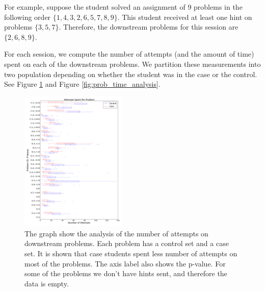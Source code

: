 \documentclass{sigchi}
\begin{document}
For example, suppose the student solved an assignment of 9 problems in the
following order $\{ 1, 4, 3, 2, 6, 5, 7, 8, 9\}$. This student
received at least one hint on problems $\{3, 5, 7\}$. Therefore, the
downstream problems for this session are $\{2, 6, 8, 9\}$.

For each session, we compute the number of attempts (and the amount of
time) spent on each of the downstream problems. We partition these
measurements into two population depending on whether the student was
in the case or the control. See Figure \ref{fig:prob_tries_analysis} and Figure \ref{fig:prob_time_analysis}.

\begin{figure}[ht]
  \centering
  \includegraphics[width=0.45\textwidth]{image/problem_tries_downstream.png}
  \caption{The graph show the analysis of the number of attempts on downstream problems. Each problem has a control set and a case set. It is shown that case students spent less number of attempts on most of the problems. The axis label also shows the p-value. For some of the problems we don't have hints sent, and therefore the data is empty.}
   \label{fig:prob_tries_analysis}
\end{figure}
\end{document}
